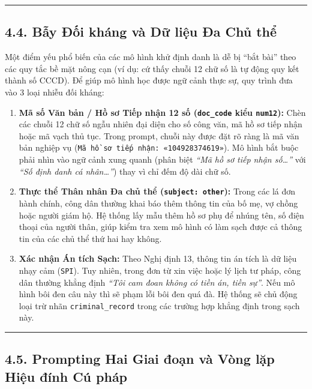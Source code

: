 \documentclass[
  11pt,
  a4paper,
]{article}
\providecommand{\tightlist}{%
  \setlength{\itemsep}{0pt}\setlength{\parskip}{0pt}}
\begin{document}
\begin{center}\rule{0.5\linewidth}{0.5pt}\end{center}

\subsection{4.4. Bẫy Đối kháng và Dữ liệu Đa Chủ
thể}\label{bux1eaby-ux111ux1ed1i-khuxe1ng-vuxe0-dux1eef-liux1ec7u-ux111a-chux1ee7-thux1ec3}

Một điểm yếu phổ biến của các mô hình khử định danh là dễ bị ``bắt bài'' theo các quy tắc bề mặt
nông cạn (ví dụ: cứ thấy chuỗi 12 chữ số là tự động quy kết thành số CCCD). Để giúp mô hình học được
ngữ cảnh thực sự, quy trình đưa vào 3 loại nhiễu đối kháng:

\begin{enumerate}
\def\labelenumi{\arabic{enumi}.}
\tightlist
\item
  \textbf{Mã số Văn bản / Hồ sơ Tiếp nhận 12 số (\texttt{doc\_code} kiểu \texttt{num12}):} Chèn các
  chuỗi 12 chữ số ngẫu nhiên đại diện cho số công văn, mã hồ sơ tiếp nhận hoặc mã vạch thủ tục.
  Trong prompt, chuỗi này được đặt rõ ràng là mã văn bản nghiệp vụ
  (\texttt{Mã\ hồ\ sơ\ tiếp\ nhận:\ «104928374619»}). Mô hình bắt buộc phải nhìn vào ngữ cảnh xung
  quanh (phân biệt \emph{``Mã hồ sơ tiếp nhận số\ldots{}''} với \emph{``Số định danh cá
  nhân\ldots{}''}) thay vì chỉ đếm độ dài chữ số.
\item
  \textbf{Thực thể Thân nhân Đa chủ thể (\texttt{subject:\ other}):} Trong các lá đơn hành chính,
  công dân thường khai báo thêm thông tin của bố mẹ, vợ chồng hoặc người giám hộ. Hệ thống lấy mẫu
  thêm hồ sơ phụ để nhúng tên, số điện thoại của người thân, giúp kiểm tra xem mô hình có làm sạch
  được cả thông tin của các chủ thể thứ hai hay không.
\item
  \textbf{Xác nhận Án tích Sạch:} Theo Nghị định 13, thông tin án tích là dữ liệu nhạy cảm
  (\texttt{SPI}). Tuy nhiên, trong đơn từ xin việc hoặc lý lịch tư pháp, công dân thường khẳng định
  \emph{``Tôi cam đoan không có tiền án, tiền sự''}. Nếu mô hình bôi đen câu này thì sẽ phạm lỗi bôi
  đen quá đà. Hệ thống sẽ chủ động loại trừ nhãn \texttt{criminal\_record} trong các trường hợp
  khẳng định trong sạch này.
\end{enumerate}

\begin{center}\rule{0.5\linewidth}{0.5pt}\end{center}

\subsection{4.5. Prompting Hai Giai đoạn và Vòng lặp Hiệu đính Cú
pháp}\label{prompting-hai-giai-ux111oux1ea1n-vuxe0-vuxf2ng-lux1eb7p-hiux1ec7u-ux111uxednh-cuxfa-phuxe1p}
\end{document}

